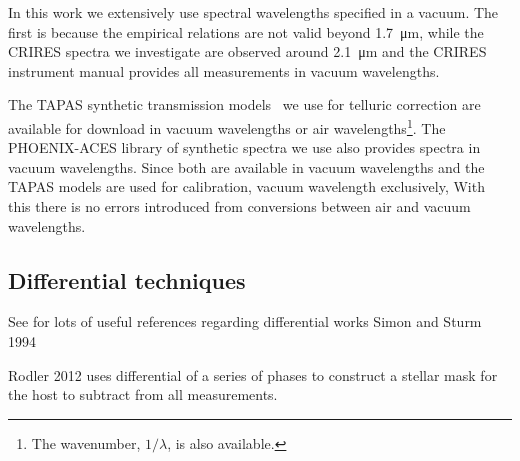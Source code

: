 In this work we extensively use spectral wavelengths specified in a vacuum. The first is because the empirical relations are not valid beyond 1.7\ \si{\micro\meter}, while the {CRIRES} spectra we investigate are observed around 2.1\ \si{\micro\meter} and the {CRIRES} instrument manual provides all measurements in vacuum wavelengths.

The {TAPAS} synthetic transmission models~\citet{bertaux_tapas_2014} we use for telluric correction are available for download in vacuum wavelengths or air wavelengths\footnote{The wavenumber, \(1/\lambda\), is also available.}. The {PHOENIX-ACES} library of synthetic spectra we use also provides spectra in vacuum wavelengths.
Since both are available in vacuum wavelengths and the {TAPAS} models are used for calibration, vacuum wavelength exclusively, With this there is no errors introduced from conversions between air and vacuum wavelengths.


\subsection{Differential techniques}
See  \citet{kostov... 2013} for lots of useful references regarding differential works Simon and Sturm 1994

Rodler 2012  uses differential of a series of phases to construct a stellar mask for the host to subtract from all measurements.
